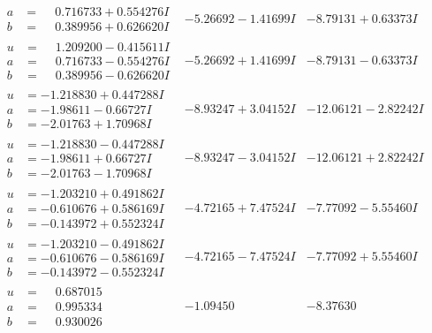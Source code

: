 \documentclass[1p]{elsarticle_modified}
\theoremstyle{definition}
\begin{document}
$$\begin{array}{c|c|c}
\begin{aligned}
a &= \phantom{-}0.716733 + 0.554276 I \\
b &= \phantom{-}0.389956 + 0.626620 I\end{aligned}
 & -5.26692 - 1.41699 I & -8.79131 + 0.63373 I \\ \hline\begin{aligned}
u &= \phantom{-}1.209200 - 0.415611 I \\
a &= \phantom{-}0.716733 - 0.554276 I \\
b &= \phantom{-}0.389956 - 0.626620 I\end{aligned}
 & -5.26692 + 1.41699 I & -8.79131 - 0.63373 I \\ \hline\begin{aligned}
u &= -1.218830 + 0.447288 I \\
a &= -1.98611 - 0.66727 I \\
b &= -2.01763 + 1.70968 I\end{aligned}
 & -8.93247 + 3.04152 I & -12.06121 - 2.82242 I \\ \hline\begin{aligned}
u &= -1.218830 - 0.447288 I \\
a &= -1.98611 + 0.66727 I \\
b &= -2.01763 - 1.70968 I\end{aligned}
 & -8.93247 - 3.04152 I & -12.06121 + 2.82242 I \\ \hline\begin{aligned}
u &= -1.203210 + 0.491862 I \\
a &= -0.610676 + 0.586169 I \\
b &= -0.143972 + 0.552324 I\end{aligned}
 & -4.72165 + 7.47524 I & -7.77092 - 5.55460 I \\ \hline\begin{aligned}
u &= -1.203210 - 0.491862 I \\
a &= -0.610676 - 0.586169 I \\
b &= -0.143972 - 0.552324 I\end{aligned}
 & -4.72165 - 7.47524 I & -7.77092 + 5.55460 I \\ \hline\begin{aligned}
u &= \phantom{-}0.687015\phantom{ +0.000000I} \\
a &= \phantom{-}0.995334\phantom{ +0.000000I} \\
b &= \phantom{-}0.930026\phantom{ +0.000000I}\end{aligned}
 & -1.09450\phantom{ +0.000000I} & -8.37630\phantom{ +0.000000I} \\ \hline\begin{aligned}

\end{aligned}
\end{array}$$
\end{document}
